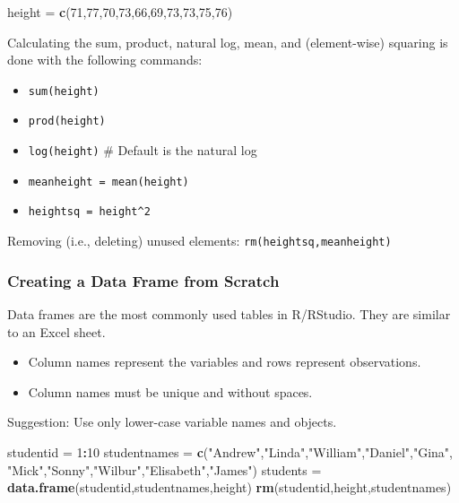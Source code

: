 \documentclass[
]{article}
\newenvironment{Shaded}{\begin{snugshade}}{\end{snugshade}}
\newcommand{\DecValTok}[1]{\textcolor[rgb]{0.00,0.00,0.81}{#1}}
\newcommand{\KeywordTok}[1]{\textcolor[rgb]{0.13,0.29,0.53}{\textbf{#1}}}
\newcommand{\NormalTok}[1]{#1}
\newcommand{\OperatorTok}[1]{\textcolor[rgb]{0.81,0.36,0.00}{\textbf{#1}}}
\newcommand{\StringTok}[1]{\textcolor[rgb]{0.31,0.60,0.02}{#1}}
\providecommand{\tightlist}{%
  \setlength{\itemsep}{0pt}\setlength{\parskip}{0pt}}
\begin{document}
\begin{Shaded}
\begin{Highlighting}[]
\NormalTok{height =}\StringTok{ }\KeywordTok{c}\NormalTok{(}\DecValTok{71}\NormalTok{,}\DecValTok{77}\NormalTok{,}\DecValTok{70}\NormalTok{,}\DecValTok{73}\NormalTok{,}\DecValTok{66}\NormalTok{,}\DecValTok{69}\NormalTok{,}\DecValTok{73}\NormalTok{,}\DecValTok{73}\NormalTok{,}\DecValTok{75}\NormalTok{,}\DecValTok{76}\NormalTok{)}
\end{Highlighting}
\end{Shaded}

Calculating the sum, product, natural log, mean, and (element-wise) squaring is done with the following commands:

\begin{itemize}
\tightlist
\item
  \texttt{sum(height)}
\item
  \texttt{prod(height)}
\item
  \texttt{log(height)} \# Default is the natural log
\item
  \texttt{meanheight\ =\ mean(height)}
\item
  \texttt{heightsq\ =\ height\^{}2}
\end{itemize}

Removing (i.e., deleting) unused elements: \texttt{rm(heightsq,meanheight)}

\hypertarget{creating-a-data-frame-from-scratch}{%
\subsubsection{Creating a Data Frame from Scratch}\label{creating-a-data-frame-from-scratch}}

Data frames are the most commonly used tables in R/RStudio. They are similar to an Excel sheet.

\begin{itemize}
\tightlist
\item
  Column names represent the variables and rows represent observations.
\item
  Column names must be unique and without spaces.
\end{itemize}

Suggestion: Use only lower-case variable names and objects.

\begin{Shaded}
\begin{Highlighting}[]
\NormalTok{studentid       =}\StringTok{ }\DecValTok{1}\OperatorTok{:}\DecValTok{10}
\NormalTok{studentnames    =}\StringTok{ }\KeywordTok{c}\NormalTok{(}\StringTok{"Andrew"}\NormalTok{,}\StringTok{"Linda"}\NormalTok{,}\StringTok{"William"}\NormalTok{,}\StringTok{"Daniel"}\NormalTok{,}\StringTok{"Gina"}\NormalTok{,}
                    \StringTok{"Mick"}\NormalTok{,}\StringTok{"Sonny"}\NormalTok{,}\StringTok{"Wilbur"}\NormalTok{,}\StringTok{"Elisabeth"}\NormalTok{,}\StringTok{"James"}\NormalTok{)}
\NormalTok{students        =}\StringTok{ }\KeywordTok{data.frame}\NormalTok{(studentid,studentnames,height)}
\KeywordTok{rm}\NormalTok{(studentid,height,studentnames)}
\end{Highlighting}
\end{Shaded}
\end{document}
